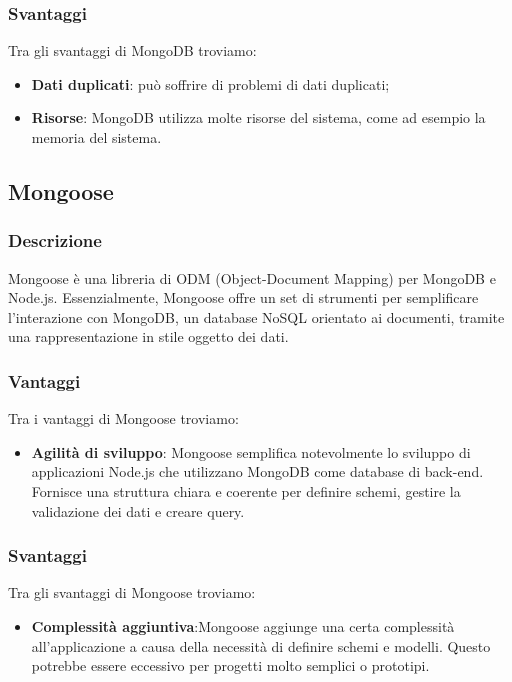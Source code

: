 \subsubsection*{Svantaggi}
Tra gli svantaggi di MongoDB troviamo:
\begin{itemize}
    \item \textbf{Dati duplicati}: può soffrire di problemi di dati duplicati;
    \item \textbf{Risorse}: MongoDB utilizza molte risorse del sistema, come ad esempio la memoria del sistema.
\end{itemize}


\subsection*{Mongoose}

\subsubsection*{Descrizione}
Mongoose è una libreria di ODM (Object-Document Mapping) per
MongoDB e Node.js. Essenzialmente, Mongoose offre un set di strumenti
per semplificare l'interazione con MongoDB, un database NoSQL orientato
ai documenti, tramite una rappresentazione in stile oggetto dei dati.

\subsubsection*{Vantaggi}
Tra i vantaggi di Mongoose troviamo:
\begin{itemize}
    \item \textbf{Agilità di sviluppo}: Mongoose semplifica notevolmente lo sviluppo di applicazioni Node.js che utilizzano MongoDB come database di back-end. Fornisce una struttura chiara e coerente per definire schemi, gestire la validazione dei dati e creare query.
\end{itemize}

\subsubsection*{Svantaggi}
Tra gli svantaggi di Mongoose troviamo:
\begin{itemize}
    \item \textbf{Complessità aggiuntiva}:Mongoose aggiunge una certa complessità all'applicazione a causa della necessità di definire schemi e modelli. Questo potrebbe essere eccessivo per progetti molto semplici o prototipi.
\end{itemize}


